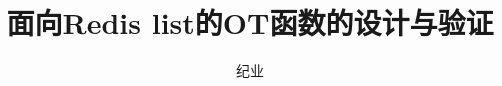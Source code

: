 \documentclass[bachelor,oneside,winfonts]{njuthesis}
\title{面向Redis list的OT函数的设计与验证}
\author{纪业}
\institute{南京大学}
\begin{document}
	
	\maketitle
	\makeenglishtitle
	
	\frontmatter
	
	
	
	\tableofcontents
	
	\mainmatter
	
	
	
	
	
	
	
	
	
	
\end{document}
